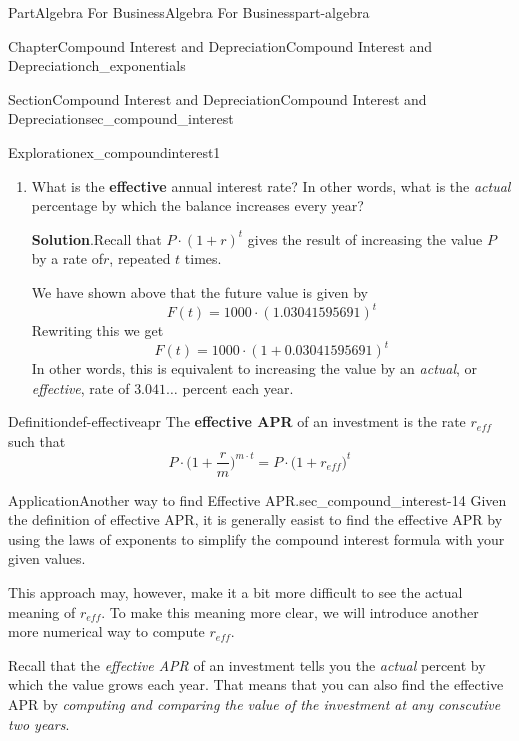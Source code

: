 \documentclass[oneside,10pt,]{tufte-book}
\newcommand{\blocktitlefont}{\relax}
\newcommand{\terminology}[1]{\textbf{#1}}
\numberwithin{equation}{chapter}
\begin{document}
\begin{partptx}{Part}{Algebra For Business}{}{Algebra For Business}{}{}{part-algebra}
\begin{chapterptx}{Chapter}{Compound Interest and Depreciation}{}{Compound Interest and Depreciation}{}{}{ch_exponentials}
\begin{sectionptx}{Section}{Compound Interest and Depreciation}{}{Compound Interest and Depreciation}{}{}{sec_compound_interest}
\begin{exploration}{Exploration}{}{ex_compoundinterest1}
\begin{enumerate}[font=\bfseries,label=(\alph*),ref=\alph*]
\begin{equation*}
F(t) = 1000\cdot \left( 1.03041595691 \right)^{t}
\end{equation*}
We have now written \(F(t) = a \cdot b^t\) with \(a=1000\) and \(b = 1.03041595691\).%
\item{}What is the \terminology{effective} annual interest rate?  In other words, what is the  \emph{actual} percentage by which the balance increases every year?%
\par\smallskip%
\noindent\textbf{\blocktitlefont Solution}.\hypertarget{ex_compoundinterest1-5-2}{}\quad{}Recall that \(P\cdot (1+ r)^t\) gives the result of increasing the value \(P\) by a rate of\(r\), repeated \(t\) times.%
\par
We have shown above that the future value is given by%
\begin{equation*}
F(t) = 1000\cdot \left( 1.03041595691 \right)^{t}
\end{equation*}
Rewriting this we get%
\begin{equation*}
F(t) = 1000\cdot \left( 1 + 0.03041595691 \right)^{t}
\end{equation*}
In other words, this is equivalent to increasing the value by an \emph{actual}, or \emph{effective}, rate of \(3.041\dots\) percent each year.%
\end{enumerate}%
\end{exploration}%
\begin{definition}{Definition}{}{def-effectiveapr}%
The \terminology{effective APR} of an investment is the rate \(r_{eff}\) such that%
\begin{equation*}
P \cdot \Big(1 + \frac{r}{m}\Big)^{m\cdot t} = P \cdot \Big(1 + r_{eff}\Big)^{t}
\end{equation*}
%
\end{definition}
\begin{insight}{Application}{Another way to find Effective APR.}{sec_compound_interest-14}%
Given the definition of effective APR, it is generally easist to find the effective APR by using the laws of exponents to simplify the compound interest formula with your given values.%
\par
This approach may, however, make it a bit more difficult to see the actual meaning of \(r_{eff}\). To make this meaning more clear, we will introduce another more numerical way to compute \(r_{eff}\).%
\par
Recall that the \emph{effective APR} of an investment tells you the \emph{actual} percent by which the value grows each year. That means that you can also find the effective APR by \emph{computing and comparing the value of the investment at any conscutive two years}.%

\end{insight}
\end{sectionptx}
\end{chapterptx}
\end{partptx}
\end{document}
